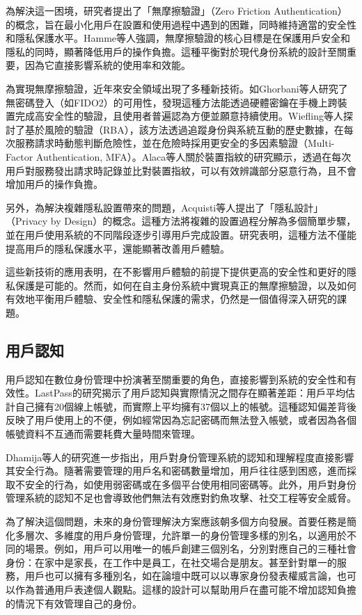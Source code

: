 為解決這一困境，研究者提出了「無摩擦驗證」（Zero Friction Authentication）的概念，旨在最小化用戶在設置和使用過程中遇到的困難，同時維持適當的安全性和隱私保護水平。Hamme等人\cite{inproceedings}強調，無摩擦驗證的核心目標是在保護用戶安全和隱私的同時，顯著降低用戶的操作負擔。這種平衡對於現代身份系統的設計至關重要，因為它直接影響系統的使用率和效能。

為實現無摩擦驗證，近年來安全領域出現了多種新技術。如Ghorbani等人\cite{ghorbani2020fido2}研究了無密碼登入（如FIDO2）的可用性，發現這種方法能透過硬體密鑰在手機上跨裝置完成高安全性的驗證，且使用者普遍認為方便並願意持續使用。Wiefling等人\cite{wiefling2021rba}探討了基於風險的驗證（RBA），該方法透過追蹤身份與系統互動的歷史數據，在每次服務請求時動態判斷危險性，並在危險時採用更安全的多因素驗證（Multi-Factor Authentication, MFA）\cite{bonneau2012mfa}。Alaca等人\cite{alaca2016devicefingerprinting}關於裝置指紋的研究顯示，透過在每次用戶對服務發出請求時記錄並比對裝置指紋，可以有效辨識部分惡意行為，且不會增加用戶的操作負擔。

另外，為解決複雜隱私設置帶來的問題，Acquisti等人\cite{acquisti2017nudges}提出了「隱私設計」（Privacy by Design）的概念。這種方法將複雜的設置過程分解為多個簡單步驟，並在用戶使用系統的不同階段逐步引導用戶完成設置。研究表明，這種方法不僅能提高用戶的隱私保護水平，還能顯著改善用戶體驗。

這些新技術的應用表明，在不影響用戶體驗的前提下提供更高的安全性和更好的隱私保護是可能的。然而，如何在自主身份系統中實現真正的無摩擦驗證，以及如何有效地平衡用戶體驗、安全性和隱私保護的需求，仍然是一個值得深入研究的課題。
\subsection{用戶認知}
用戶認知在數位身份管理中扮演著至關重要的角色，直接影響到系統的安全性和有效性。LastPass\cite{lastpass2020psychology}的研究揭示了用戶認知與實際情況之間存在顯著差距：用戶平均估計自己擁有20個線上帳號，而實際上平均擁有37個以上的帳號。這種認知偏差背後反映了用戶使用上的不便，例如經常因為忘記密碼而無法登入帳號，或者因為各個帳號資料不互通而需要耗費大量時間來管理。

Dhamija等人\cite{dhamija2008sevenflaws}的研究進一步指出，用戶對身份管理系統的認知和理解程度直接影響其安全行為。隨著需要管理的用戶名和密碼數量增加，用戶往往感到困惑，進而採取不安全的行為，如使用弱密碼或在多個平台使用相同密碼等。此外，用戶對身份管理系統的認知不足也會導致他們無法有效應對釣魚攻擊、社交工程等安全威脅。

為了解決這個問題，未來的身份管理解決方案應該朝多個方向發展。首要任務是簡化多層次、多維度的用戶身份管理，允許單一的身份管理多樣的別名，以適用於不同的場景。例如，用戶可以用唯一的帳戶創建三個別名，分別對應自己的三種社會身份：在家中是家長，在工作中是員工，在社交場合是朋友。甚至針對單一的服務，用戶也可以擁有多種別名，如在論壇中既可以以專家身份發表權威言論，也可以作為普通用戶表達個人觀點。這樣的設計可以幫助用戶在盡可能不增加認知負擔的情況下有效管理自己的身份。

